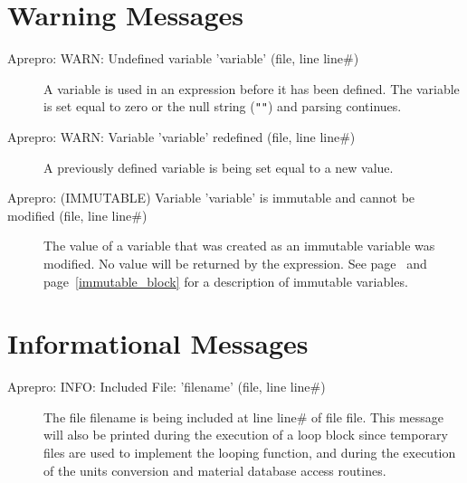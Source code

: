 \section{Warning Messages}

\begin{description}
\item[Aprepro:  WARN:  Undefined  variable  'variable'  (file,  line  line\#)]
A variable is used in an expression before it has been defined. The variable is 
set equal to zero or the null string (\texttt{"}\texttt{"}) and parsing continues.

\item[Aprepro:  WARN:  Variable  'variable'  redefined  (file,  line  line\#)]
A previously defined variable is being set equal to a new value.

\item[Aprepro: (IMMUTABLE) Variable 'variable' is immutable and cannot be modified (file, line line\#)]
The value of a variable that was created as an immutable variable was
modified. No value will be returned by the expression. See page~\pageref{immutable} and
page~\ref{immutable_block} for a description of immutable variables.
\end{description}


\section{Informational Messages}

\begin{description}
\item[Aprepro: INFO: Included File: 'filename' (file, line line\#)] The file filename 
is being included at line line\# of file file. This message will also be printed 
during the execution of a loop block since temporary files are used to implement 
the looping function, and during the execution of the units conversion and material 
database access routines.
\end{description}
